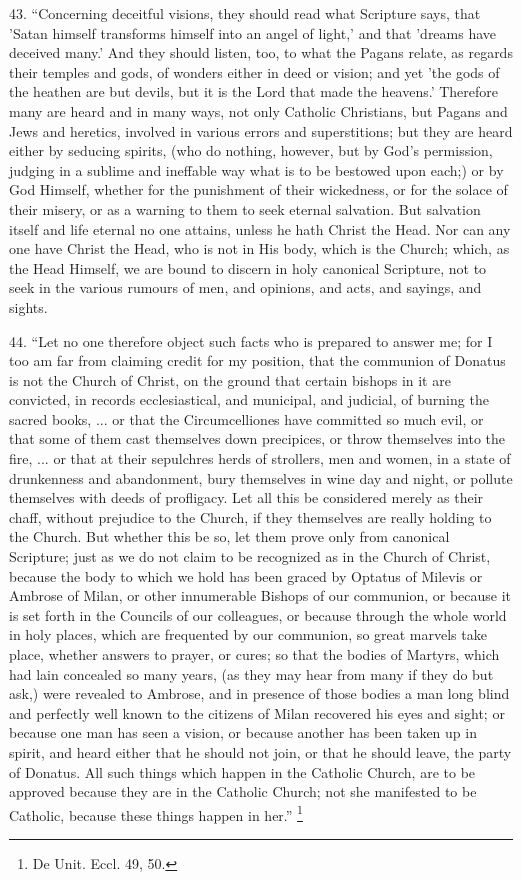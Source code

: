 43. ``Concerning
deceitful visions, they should read what Scripture says, that 'Satan
himself transforms himself into an angel of light,' and that 'dreams
have deceived many.' And they should listen, too, to what the Pagans
relate, as regards their temples and gods, of wonders either in deed
or vision; and yet 'the gods of the heathen are but devils, but it is
the Lord that made the heavens.' Therefore many are heard and in many
ways, not only Catholic Christians, but Pagans and Jews and heretics,
involved in various errors and superstitions; but they are heard
either by seducing spirits, (who do nothing, however, but by God's
permission, judging in a sublime and ineffable way what is to be
bestowed upon each;) or by God Himself, whether for the punishment of
their wickedness, or for the solace of their misery, or as a warning
to them to seek eternal salvation. But salvation itself and life
eternal no one attains, unless he hath Christ the Head. Nor can any
one have Christ the Head, who is not in His body, which is the
Church; which, as the Head Himself, we are bound to discern in holy
canonical Scripture, not to seek in the various rumours of men, and
opinions, and acts, and sayings, and sights.

44.
``Let no one therefore object such facts who is prepared to answer
me; for I too am far from claiming credit for my position, that the
communion of Donatus is not the Church of Christ, on the ground that
certain bishops in it are convicted, in records ecclesiastical, and
municipal, and judicial, of burning the sacred books, ... or that the
Circumcelliones have committed so much evil, or that some of them cast
themselves down precipices, or throw themselves into the fire,
... or that at their sepulchres herds of strollers, men and
women, in a state of drunkenness and abandonment, bury themselves in
wine day and night, or pollute themselves with deeds of profligacy.
Let all this be considered merely as their chaff, without prejudice to
the Church, if they themselves are really holding to the Church. But
whether this be so, let them prove only from canonical Scripture; just
as we do not claim to be recognized as in the Church of Christ,
because the body to which we hold has been graced by Optatus of
Milevis or Ambrose of Milan, or other innumerable Bishops of our
communion, or because it is set forth in the Councils of our
colleagues, or because through the whole world in holy places, which
are frequented by our communion, so great marvels take place,
whether answers to prayer, or cures; so that the bodies of Martyrs,
which had lain concealed so many years, (as they may hear from many if
they do but ask,) were revealed to Ambrose, and in presence of those
bodies a man long blind and perfectly well known to the citizens of
Milan recovered his eyes and sight; or because one man has seen a
vision, or because another has been taken up in spirit, and heard
either that he should not join, or that he should leave, the party of
Donatus. All such things which happen in the Catholic Church, are to
be approved because they are in the Catholic Church; not she
manifested to be Catholic, because these things happen in her.'' \footnote{De Unit. Eccl. 49, 50.}

